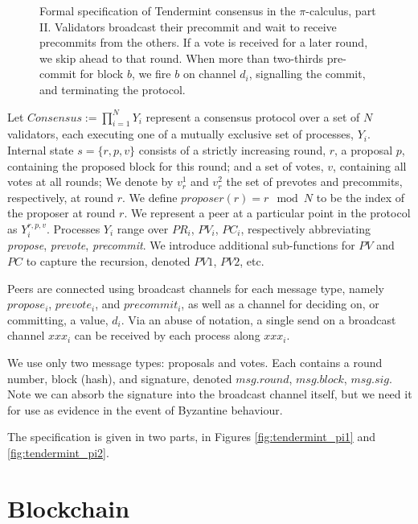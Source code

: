 \begin{figure}[]
    	\centering
	
	\caption[Formal specification of Tendermint consensus in the $\pi$-calculus, part II]{Formal specification of Tendermint consensus in the $\pi$-calculus, part II.
Validators broadcast their precommit and wait to receive precommits from the others.
If a vote is received for a later round, we skip ahead to that round.
When more than two-thirds pre-commit for block $b$, we fire $b$ on channel $d_i$, signalling the commit,
and terminating the protocol.
}
	\label{fig:tendermint_pi}
\end{figure}


Let $Consensus := \prod_{i=1}^N Y_i $ represent a consensus protocol
over a set of $N$ validators, each executing one of a mutually exclusive set of processes, $Y_i$.
Internal state $s = \{r, p, v \}$ consists of a strictly increasing round, $r$,
a proposal $p$, containing the proposed block for this round;
and a set of votes, $v$, containing all votes at all rounds;
We denote by $v_r^1$ and $v_r^2$ the set of prevotes and precommits, respectively, at round $r$.
We define $proposer(r) = r \mod N$ to be the index of the proposer at round $r$.
We represent a peer at a particular point in the protocol as $Y_i^{r, p, v}$.
Processes $Y_i$ range over $PR_i$, $PV_i$, $PC_i$, 
respectively abbreviating 
\emph{propose}, \emph{prevote}, \emph{precommit}.
We introduce additional sub-functions for $PV$ and $PC$ to capture the recursion,
denoted $PV1$, $PV2$, etc.

Peers are connected using broadcast channels for each message type,
namely $propose_i$, $prevote_i$, and $precommit_i$,
as well as a channel for deciding on, or committing, a value, $d_i$.
Via an abuse of notation, a single send on a broadcast channel $xxx_i$ can be received by each process along
$xxx_i$.

We use only two message types: proposals and votes. 
Each contains a round number, block (hash), and signature, 
denoted $msg.round$, $msg.block$, $msg.sig$.
Note we can absorb the signature into the broadcast channel itself,
but we need it for use as evidence in the event of Byzantine behaviour.

The specification is given in two parts, in Figures \ref{fig:tendermint_pi1} and \ref{fig:tendermint_pi2}.

\section{Blockchain}


